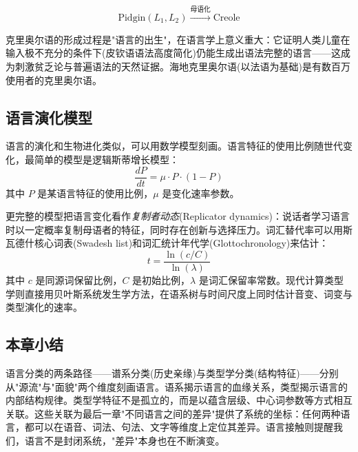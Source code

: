 \begin{equation}
    \text{Pidgin}(L_1, L_2) \xrightarrow{\text{母语化}} \text{Creole}
\end{equation}

克里奥尔语的形成过程是"语言的出生"，在语言学上意义重大：它证明人类儿童在输入极不充分的条件下(皮钦语语法高度简化)仍能生成出语法完整的语言——这成为刺激贫乏论与普遍语法的天然证据。海地克里奥尔语(以法语为基础)是有数百万使用者的克里奥尔语。

\subsection{语言演化模型}

语言的演化和生物进化类似，可以用数学模型刻画。语言特征的使用比例随世代变化，最简单的模型是逻辑斯蒂增长模型：
\begin{equation}
    \frac{dP}{dt} = \mu \cdot P \cdot (1 - P)
\end{equation}
其中 $P$ 是某语言特征的使用比例，$\mu$ 是变化速率参数。

更完整的模型把语言变化看作\emph{复制者动态}(Replicator dynamics)：说话者学习语言时以一定概率复制母语者的特征，同时存在创新与选择压力。词汇替代率可以用斯瓦德什核心词表(Swadesh list)和词汇统计年代学(Glottochronology)来估计：
\begin{equation}
    t = \frac{\ln (c/C)}{\ln (\lambda)}
\end{equation}
其中 $c$ 是同源词保留比例，$C$ 是初始比例，$\lambda$ 是词汇保留率常数。现代计算类型学则直接用贝叶斯系统发生学方法，在语系树与时间尺度上同时估计音变、词变与类型演化的速率。

\subsection{本章小结}

语言分类的两条路径——谱系分类(历史亲缘)与类型学分类(结构特征)——分别从"源流"与"面貌"两个维度刻画语言。语系揭示语言的血缘关系，类型揭示语言的内部结构规律。类型学特征不是孤立的，而是以蕴含层级、中心词参数等方式相互关联。这些关联为最后一章"不同语言之间的差异"提供了系统的坐标：任何两种语言，都可以在语音、词法、句法、文字等维度上定位其差异。语言接触则提醒我们，语言不是封闭系统，"差异"本身也在不断演变。
